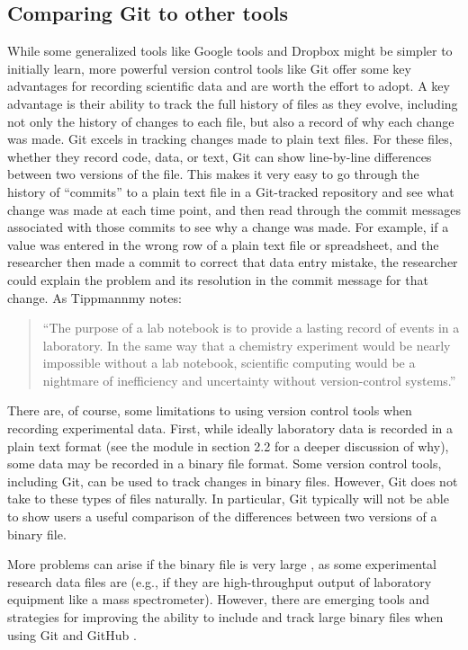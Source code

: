 \documentclass[]{tufte-book}
\begin{document}
\subsection{Comparing Git to other tools}\label{comparing-git-to-other-tools}

While some generalized tools like Google tools and Dropbox might be simpler to
initially learn, more powerful version control tools like Git offer some key
advantages for recording scientific data and are worth the effort to adopt. A
key advantage is their ability to track the full history of files as they
evolve, including not only the history of changes to each file, but also a
record of why each change was made. Git excels in tracking changes made to plain
text files. For these files, whether they record code, data, or text, Git can
show line-by-line differences between two versions of the file. This makes it
very easy to go through the history of ``commits'' to a plain text file in a
Git-tracked repository and see what change was made at each time point, and then
read through the commit messages associated with those commits to see why a
change was made. For example, if a value was entered in the wrong row of a plain
text file or spreadsheet, and the researcher then made a commit to correct that
data entry mistake, the researcher could explain the problem and its resolution
in the commit message for that change. As Tippmannmy notes:

\begin{quote}
``The purpose of a lab notebook is to provide a lasting record of events in a
laboratory. In the same way that a chemistry experiment would be nearly
impossible without a lab notebook, scientific computing would be a nightmare of
inefficiency and uncertainty without version-control systems.''
\citep{tippmannmy2014digital}
\end{quote}

There are, of course, some limitations to using version control tools when
recording experimental data. First, while ideally laboratory data is recorded in
a plain text format (see the module in section 2.2 for a deeper discussion of
why), some data may be recorded in a binary file format. Some version control
tools, including Git, can be used to track changes in binary files. However, Git
does not take to these types of files naturally. In particular, Git typically
will not be able to show users a useful comparison of the differences between
two versions of a binary file.

More problems can arise if the binary file is
very large \citep{perez2016ten, blischak2016quick}, as some experimental research
data files are (e.g., if they are high-throughput output of laboratory equipment
like a mass spectrometer). However, there are emerging tools and strategies for
improving the ability to include and track large binary files when using Git and
GitHub \citep{blischak2016quick}.
\end{document}
